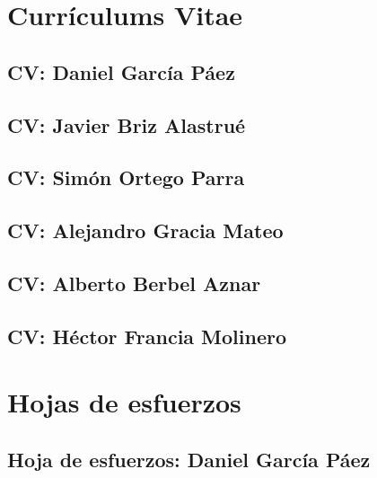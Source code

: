 \documentclass[10pt,spanish]{article}
\begin{document}
\section{Currículums Vitae}

\blindtext
\subsection{CV: Daniel García Páez}

\blindtext
\subsection{CV: Javier Briz Alastrué}

\blindtext
\subsection{CV: Simón Ortego Parra}

\blindtext
\subsection{CV: Alejandro Gracia Mateo}

\blindtext
\subsection{CV: Alberto Berbel Aznar}

\blindtext
\subsection{CV: Héctor Francia Molinero}

\blindtext

\section{Hojas de esfuerzos}

\blindtext
\subsection{Hoja de esfuerzos: Daniel García Páez}

\blindtext
\end{document}
